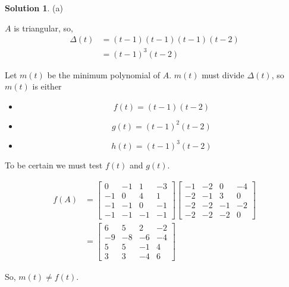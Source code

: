 \documentclass{article}
\theoremstyle{definition}
\newtheorem*{solution}{Solution}
\theoremstyle{remark}
\begin{document}
\begin{solution}

(a)

$A$ is triangular, so,
\begin{align*}
\Delta(t) & = (t-1)(t-1)(t-1)(t-2) \\
& = (t-1)^3(t-2)
\end{align*}

Let $m(t)$ be the minimum polynomial of $A$.
$m(t)$ must divide $\Delta(t)$, so $m(t)$ is either
\begin{itemize}
 \item \[f(t)=(t-1)(t-2)\]
 \item \[g(t)=(t-1)^2(t-2)\]
 \item \[h(t)=(t-1)^3(t-2)\]
\end{itemize}

To be certain we must test $f(t)$ and $g(t)$.

\begin{align*}
f(A) & = 
\begin{bmatrix}
0 & -1 & 1 & -3 \\
-1 & 0 & 4 & 1 \\
-1 & -1 & 0 & -1 \\
-1 & -1 & -1 & -1
\end{bmatrix}
\begin{bmatrix}
-1 & -2 & 0 & -4 \\
-2 & -1 & 3 & 0 \\
-2 & -2 & -1 & -2 \\
-2 & -2 & -2 & 0
\end{bmatrix} \\
& =
\begin{bmatrix}
6 & 5 & 2 & -2 \\
-9 & -8 & -6 & -4 \\
5 & 5 & -1 & 4 \\
3 & 3 & -4 & 6
\end{bmatrix}
\end{align*}

So, $m(t)\neq f(t)$.


\end{solution}
\end{document}
